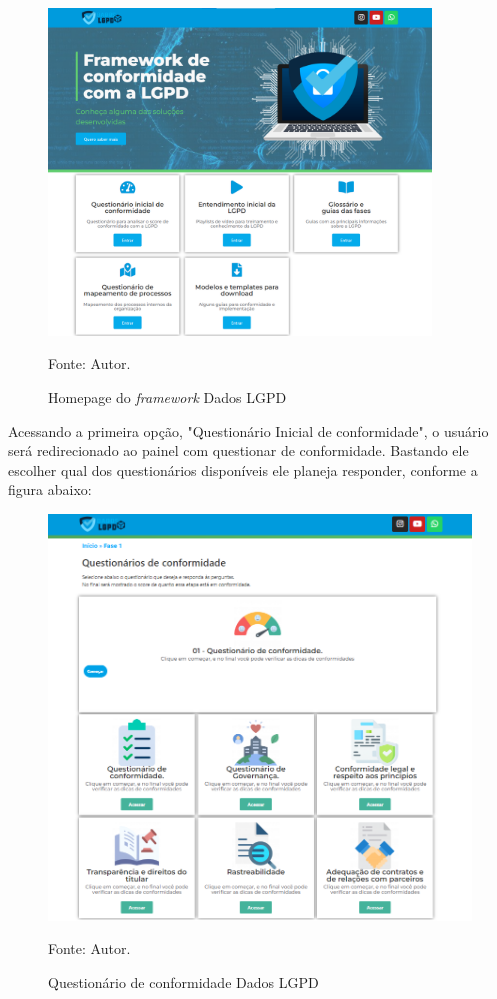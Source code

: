 \documentclass[
	12pt,				%
	openright,			%
	oneside,			%
	a4paper,			%
	english,			%
	french,				%
	spanish,			%
	brazil,				%
	]{abntex2}
\begin{document}
\begin{figure}[ht]
    \centering
    \caption{Homepage do \textit{framework} Dados LGPD}
    \includegraphics[width=4.0in]{Images/homepag.png}
    \label{fig: homepage}
    
    \centering \small Fonte: Autor.
\end{figure}

Acessando a primeira opção, "Questionário Inicial de conformidade", o usuário será redirecionado ao painel com questionar de conformidade. Bastando ele escolher qual dos questionários disponíveis ele planeja responder, conforme a figura abaixo:

\begin{figure}[ht]
    \centering
    \caption{Questionário de conformidade Dados LGPD}
    \includegraphics[width=6.6in]{Images/fase1.png}
    \label{fig: homepage}
    
    \centering \small Fonte: Autor.
\end{figure}
\end{document}
